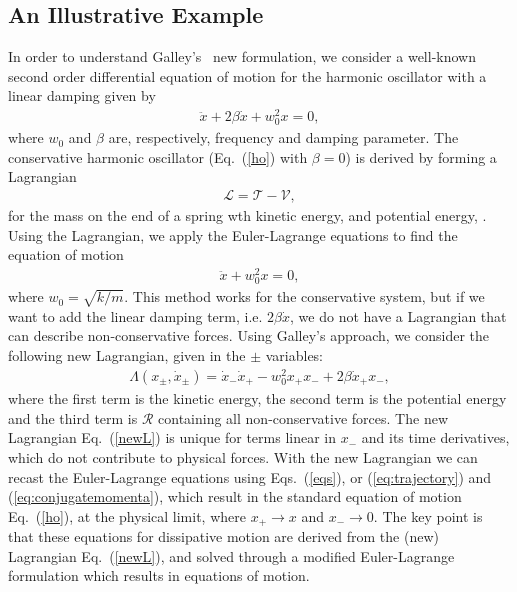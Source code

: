 \subsection{An Illustrative Example}
In order to understand Galley's~\cite{Galley} new formulation, we consider a well-known second order differential equation of motion for the harmonic oscillator with a linear damping given by
\begin{align}
 \ddot{x} + 2\beta \dot{x} +w_0^2 x   = 0,
 \label{ho}
\end{align}
where $w_0$ and $\beta$ are, respectively, frequency and damping parameter.  The conservative harmonic oscillator (Eq.~(\ref{ho}) with $\beta=0$) is derived by forming a Lagrangian 
\begin{align}
\mathcal{L} = \mathcal{T}  - \mathcal{V},
\end{align}
for the mass on the end of a spring wth kinetic energy,  and potential energy, .  Using the Lagrangian, we apply the Euler-Lagrange equations to find the equation of motion 
\begin{align}
\ddot{x} + w_0^2 x = 0,
\end{align}
where $w_0 = \sqrt{k/m}$.  This method works for the conservative system, but if we want to add the linear damping term, i.e. $2\beta \dot{x}$, we do not have a Lagrangian that can describe non-conservative forces.  Using Galley's approach, we consider the following new Lagrangian, given in the $\pm$ variables:
\begin{align}
\Lambda(x_{\pm}, \dot{x}_{\pm}) = \dot{x}_-  \dot{x}_+ -  w_0^2 x_+ x_-  + 2\beta \dot{x}_+x_-, 
\label{newL}
\end{align}
where the first term is the kinetic energy, the second term is the potential energy and the third term is $\mathcal{R}$ containing all non-conservative forces.  The new Lagrangian Eq.~(\ref{newL}) is unique for terms linear in $x_-$ and its time derivatives, which do not contribute to physical forces.  With the new Lagrangian we can recast the Euler-Lagrange equations using Eqs.~(\ref{eqs}), or (\ref{eq:trajectory}) and (\ref{eq:conjugatemomenta}), which result in the standard equation of motion Eq.~(\ref{ho}), at the physical limit, where $x_+ \to x$ and $x_- \to 0$. 
The key point is that these equations for dissipative motion are derived from the (new) Lagrangian Eq.~(\ref{newL}), and solved through a modified Euler-Lagrange formulation which results in equations of motion.  

